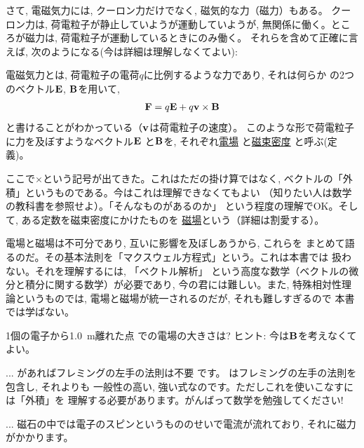さて, 電磁気力には, クーロン力だけでなく, 磁気的な力（磁力）もある。
クーロン力は, 荷電粒子が静止していようが運動していようが, 
無関係に働く。ところが磁力は, 荷電粒子が運動しているときにのみ働く。
それらを含めて正確に言えば, 次のようになる(今は詳細は理解しなくてよい):

電磁気力とは, 荷電粒子の電荷$q$に比例するような力であり, それは何らか
の2つのベクトル${\bf E}$, ${\bf B}$を用いて, 
\begin{eqnarray}
{\bf F}=q{\bf E}+q{\bf v}\times{\bf B}\label{eq:LorentsForce}
\end{eqnarray}
と書けることがわかっている（${\bf v}$は荷電粒子の速度）。
このような形で荷電粒子に力を及ぼすようなベクトル${\bf E}$
と${\bf B}$を, それぞれ\underline{電場}
と\underline{磁束密度}
と呼ぶ(定義)。

ここで$\times$という記号が出てきた。これはただの掛け算ではなく, 
ベクトルの「外積」というものである。今はこれは理解できなくてもよい
（知りたい人は数学の教科書を参照せよ）。「そんなものがあるのか」
という程度の理解でOK。そして, ある定数を磁束密度にかけたものを
\underline{磁場}という（詳細は割愛する）。\mv

電場と磁場は不可分であり, 互いに影響を及ぼしあうから, これらを
まとめて語るのだ。その基本法則を「マクスウェル方程式」という。これは本書では
扱わない。それを理解するには, 「ベクトル解析」
という高度な数学（ベクトルの微分と積分に関する数学）が必要であり, 
今の君には難しい。また, 特殊相対性理論というものでは, 
電場と磁場が統一されるのだが, それも難しすぎるので
本書では学ばない。\mv

\begin{q}\label{q:Coulomb_EF} 1個の電子から1.0~m離れた点
での電場の大きさは? ヒント: 今は${\bf B}$を考えなくてよい。\end{q}

\begin{faq}{\small{}
... があればフレミングの左手の法則は不要
です。
はフレミングの左手の法則を包含し, それよりも
一般性の高い, 強い式なのです。ただしこれを使いこなすには「外積」を
理解する必要があります。がんばって数学を勉強してください!}\end{faq}

\begin{faq}{\small{}
... 磁石の中では電子のスピンというもののせいで電流が流れており, 
それに磁力がかかります。}\end{faq}

